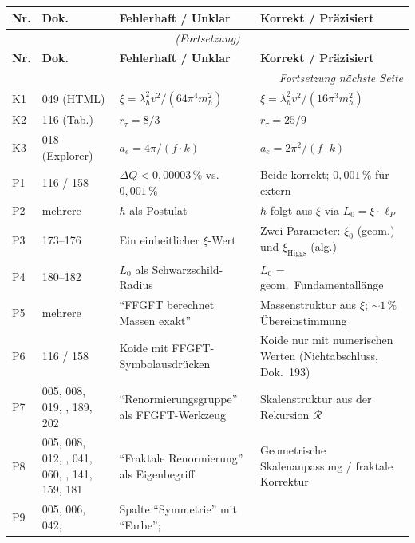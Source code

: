 {\scriptsize
\begin{longtable}{p{0.6cm}p{2.4cm}p{5.5cm}p{5.5cm}}
\toprule
\textbf{Nr.} & \textbf{Dok.} & \textbf{Fehlerhaft / Unklar} & \textbf{Korrekt / Präzisiert} \\
\midrule
\endfirsthead
\multicolumn{4}{c}{\scriptsize\emph{(Fortsetzung)}}\\
\toprule
\textbf{Nr.} & \textbf{Dok.} & \textbf{Fehlerhaft / Unklar} & \textbf{Korrekt / Präzisiert} \\
\midrule
\endhead
\midrule
\multicolumn{4}{r}{\scriptsize\emph{Fortsetzung nächste Seite}}\\
\endfoot
\bottomrule
\endlastfoot
K1 & 049 (HTML) &
  $\xi = \lambda_h^2 v^2/(64\pi^4 m_h^2)$ &
  $\xi = \lambda_h^2 v^2/(16\pi^3 m_h^2)$ \\[3pt]
K2 & 116 (Tab.) &
  $r_\tau = 8/3$ &
  $r_\tau = 25/9$ \\[3pt]
K3 & 018 (Explorer) &
  $a_e = 4\pi/(f \cdot k)$ &
  $a_e = 2\pi^2/(f \cdot k)$ \\[3pt]
P1 & 116 / 158 &
  $\Delta Q < 0{,}00003\,\%$ vs.\ $0{,}001\,\%$ &
  Beide korrekt; $0{,}001\,\%$ für extern \\[3pt]
P2 & mehrere &
  $\hbar$ als Postulat &
  $\hbar$ folgt aus $\xi$ via $L_0 = \xi\cdot\ell_P$ \\[3pt]
P3 & 173--176 &
  Ein einheitlicher $\xi$-Wert &
  Zwei Parameter: $\xi_0$ (geom.) und $\xi_{\text{Higgs}}$ (alg.) \\[3pt]
P4 & 180--182 &
  $L_0$ als Schwarzschild-Radius &
  $L_0$ = geom.\ Fundamentallänge \\[3pt]
P5 & mehrere &
  \enquote{FFGFT berechnet Massen exakt} &
  Massenstruktur aus $\xi$; $\sim 1\,\%$ Übereinstimmung \\[3pt]
P6 & 116 / 158 &
  Koide mit FFGFT-Symbolausdrücken &
  Koide nur mit numerischen Werten (Nichtabschluss, Dok.~193) \\[3pt]
P7 & 005, 008, 019, \newline 086, 189, 202 &
  \enquote{Renormierungsgruppe} als FFGFT-Werkzeug &
  Skalenstruktur aus der Rekursion $\mathcal{R}$ \\[3pt]
P8 & 005, 008, 012, \newline 014, 041, 060, \newline 133, 141, 159, 181 &
  \enquote{Fraktale Renormierung} als Eigenbegriff &
  Geometrische Skalen\-anpassung / fraktale Korrektur \\
P9 & 005, 006, 042, \newline 046 &
  Spalte \enquote{Symmetrie} mit \enquote{Farbe}; \newline

\end{longtable}}
